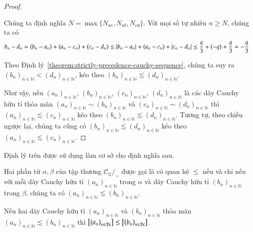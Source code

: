 \begin{proof}
\begin{enumerate}[label={\textbf{Trường hợp \arabic*.}},itemindent=2cm]
              Chúng ta định nghĩa $N = \max\{ N_{ac}, N_{ab}, N_{cd} \}$. Với mọi số tự nhiên $n\geq N$, chúng ta có
              \[
                  b_{n} - d_{n} = (b_{n} - a_{n}) + (a_{n} - c_{n}) + (c_{n} - d_{n}) \leq \left\vert{b_{n} - a_{n}}\right\vert + (a_{n} - c_{n}) + \left\vert{c_{n} - d_{n}}\right\vert \leq \frac{q}{3} + (-q) + \frac{q}{3} = -\frac{q}{3}
              \]

              Theo Định lý~\ref{theorem:strictly-precedence-cauchy-sequence}, chúng ta suy ra ${(b_{n})}_{n\in\mathbb{N}} < {(d_{n})}_{n\in\mathbb{N}}$, kéo theo ${(b_{n})}_{n\in\mathbb{N}}\lesssim {(d_{n})}_{n\in\mathbb{N}}$.
    \end{enumerate}

    Như vậy, nếu ${(a_{n})}_{n\in\mathbb{N}}$, ${(b_{n})}_{n\in\mathbb{N}}$, ${(c_{n})}_{n\in\mathbb{N}}$, ${(d_{n})}_{n\in\mathbb{N}}$ là các dãy Cauchy hữu tỉ thỏa mãn ${(a_{n})}_{n\in\mathbb{N}}\sim {(b_{n})}_{n\in\mathbb{N}}$ và ${(c_{n})}_{n\in\mathbb{N}}\sim {(d_{n})}_{n\in\mathbb{N}}$ thì ${(a_{n})}_{n\in\mathbb{N}}\lesssim {(c_{n})}_{n\in\mathbb{N}}$ kéo theo ${(b_{n})}_{n\in\mathbb{N}}\lesssim {(d_{n})}_{n\in\mathbb{N}}$. Tương tự, theo chiều ngược lại, chúng ta cũng có ${(b_{n})}_{n\in\mathbb{N}}\lesssim {(d_{n})}_{n\in\mathbb{N}}$ kéo theo ${(a_{n})}_{n\in\mathbb{N}}\lesssim {(c_{n})}_{n\in\mathbb{N}}$.
\end{proof}

Định lý trên được sử dụng làm cơ sở cho định nghĩa sau.
\begin{definition}
    Hai phần tử $\alpha, \beta$ của tập thương $\mathscr{C}_{\mathbb{Q}}/_{\sim}$ được gọi là có quan hệ $\leq$ nếu và chỉ nếu với mỗi dãy Cauchy hữu tỉ ${(a_{n})}_{n\in\mathbb{N}}$ trong $\alpha$ và dãy Cauchy hữu tỉ ${(b_{n})}_{n\in\mathbb{N}}$ trong $\beta$, chúng ta có ${(a_{n})}_{n\in\mathbb{N}}\lesssim {(b_{n})}_{n\in\mathbb{N}}$.
\end{definition}

\begin{theorem}\label{theorem:preorder-to-order}
    Nếu hai dãy Cauchy hữu tỉ ${(a_{n})}_{n\in\mathbb{N}}$ và ${(b_{n})}_{n\in\mathbb{N}}$ thỏa mãn ${(a_{n})}_{n\in\mathbb{N}}\lesssim {(b_{n})}_{n\in\mathbb{N}}$ thì $\left[{\left({a_{n}}\right)}_{{n}\in\mathbb{N}}\right]\leq \left[{\left({b_{n}}\right)}_{{n}\in\mathbb{N}}\right]$.
\end{theorem}

